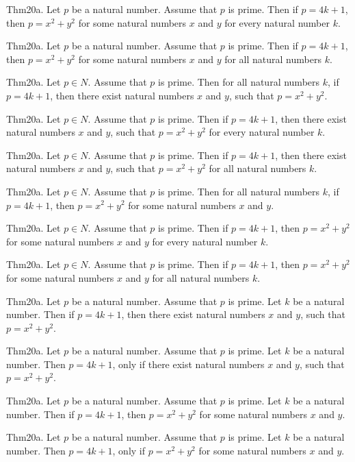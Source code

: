 \documentclass{article}
\begin{document}
Thm20a. Let $p$ be a natural number. Assume that $p$ is prime. Then if $p = 4 k + 1$, then $p = x ^{ 2}+ y ^{ 2}$ for some natural numbers $x$ and $y$ for every natural number $k$.

Thm20a. Let $p$ be a natural number. Assume that $p$ is prime. Then if $p = 4 k + 1$, then $p = x ^{ 2}+ y ^{ 2}$ for some natural numbers $x$ and $y$ for all natural numbers $k$.

Thm20a. Let $p \in N$. Assume that $p$ is prime. Then for all natural numbers $k$, if $p = 4 k + 1$, then there exist natural numbers $x$ and $y$, such that $p = x ^{ 2}+ y ^{ 2}$.

Thm20a. Let $p \in N$. Assume that $p$ is prime. Then if $p = 4 k + 1$, then there exist natural numbers $x$ and $y$, such that $p = x ^{ 2}+ y ^{ 2}$ for every natural number $k$.

Thm20a. Let $p \in N$. Assume that $p$ is prime. Then if $p = 4 k + 1$, then there exist natural numbers $x$ and $y$, such that $p = x ^{ 2}+ y ^{ 2}$ for all natural numbers $k$.

Thm20a. Let $p \in N$. Assume that $p$ is prime. Then for all natural numbers $k$, if $p = 4 k + 1$, then $p = x ^{ 2}+ y ^{ 2}$ for some natural numbers $x$ and $y$.

Thm20a. Let $p \in N$. Assume that $p$ is prime. Then if $p = 4 k + 1$, then $p = x ^{ 2}+ y ^{ 2}$ for some natural numbers $x$ and $y$ for every natural number $k$.

Thm20a. Let $p \in N$. Assume that $p$ is prime. Then if $p = 4 k + 1$, then $p = x ^{ 2}+ y ^{ 2}$ for some natural numbers $x$ and $y$ for all natural numbers $k$.

Thm20a. Let $p$ be a natural number. Assume that $p$ is prime. Let $k$ be a natural number. Then if $p = 4 k + 1$, then there exist natural numbers $x$ and $y$, such that $p = x ^{ 2}+ y ^{ 2}$.

Thm20a. Let $p$ be a natural number. Assume that $p$ is prime. Let $k$ be a natural number. Then $p = 4 k + 1$, only if there exist natural numbers $x$ and $y$, such that $p = x ^{ 2}+ y ^{ 2}$.

Thm20a. Let $p$ be a natural number. Assume that $p$ is prime. Let $k$ be a natural number. Then if $p = 4 k + 1$, then $p = x ^{ 2}+ y ^{ 2}$ for some natural numbers $x$ and $y$.

Thm20a. Let $p$ be a natural number. Assume that $p$ is prime. Let $k$ be a natural number. Then $p = 4 k + 1$, only if $p = x ^{ 2}+ y ^{ 2}$ for some natural numbers $x$ and $y$.
\end{document}
